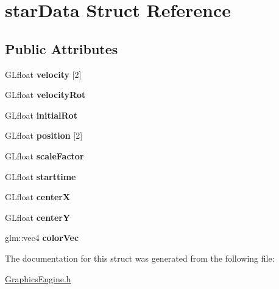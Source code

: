 \hypertarget{structstar_data}{}\section{star\+Data Struct Reference}
\label{structstar_data}
\subsection*{Public Attributes}
\begin{DoxyCompactItemize}
\item 
\mbox{\label{structstar_data_a1ccf2aa8828d3e171afcd7a24751e45f}} 
G\+Lfloat {\bfseries velocity} \mbox{[}2\mbox{]}
\item 
\mbox{\label{structstar_data_a28d7965c899402b1d81e7c76c8890ced}} 
G\+Lfloat {\bfseries velocity\+Rot}
\item 
\mbox{\label{structstar_data_a0e606721cc9cabaeecddade97b431425}} 
G\+Lfloat {\bfseries initial\+Rot}
\item 
\mbox{\label{structstar_data_a53ac77cbeea702fdf7483f2c30b17b28}} 
G\+Lfloat {\bfseries position} \mbox{[}2\mbox{]}
\item 
\mbox{\label{structstar_data_a5d00866ed30ee543b63ec121a737f1b4}} 
G\+Lfloat {\bfseries scale\+Factor}
\item 
\mbox{\label{structstar_data_a521623dd9e04927c9ce63e33f6165273}} 
G\+Lfloat {\bfseries starttime}
\item 
\mbox{\label{structstar_data_a61c9458004d566376a2a6fd8b7c9f407}} 
G\+Lfloat {\bfseries centerX}
\item 
\mbox{\label{structstar_data_a02c1ad19362c6d4ce740f1785d71fdd7}} 
G\+Lfloat {\bfseries centerY}
\item 
\mbox{\label{structstar_data_af6465fa839fe6217cc608d85ca290923}} 
glm\+::vec4 {\bfseries color\+Vec}
\end{DoxyCompactItemize}


The documentation for this struct was generated from the following file\+:\begin{DoxyCompactItemize}
\item 
\hyperlink{_graphics_engine_8h}{Graphics\+Engine.\+h}\end{DoxyCompactItemize}
